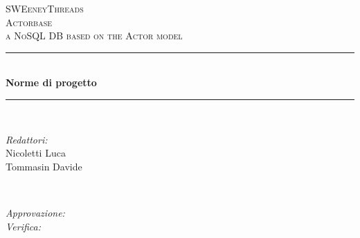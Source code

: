 \documentclass[a4paper]{article}
\begin{document}
	\begin{titlepage}
		\newcommand{\HRule}{\rule{\linewidth}{0.5mm}}
		\center

		\textsc{\LARGE SWEeneyThreads}\\[1.5cm]
		\textsc{\Large Actorbase}\\[0.5cm]
		\textsc{\large a NoSQL DB based on the Actor model}\\[0.5cm]


		\HRule \\[0.4cm]
		{ \huge \bfseries Norme di progetto}\\[0.4cm]
		\HRule \\[1.5cm]

		\begin{minipage}{0.4\textwidth}
			\begin{flushleft} \large
				\emph{Redattori:}\\
				Nicoletti Luca \\
				Tommasin Davide\\
			\end{flushleft}
		\end{minipage}
		~
		\begin{minipage}{0.4\textwidth}
			\begin{flushright} \large
				\emph{Approvazione:} \\
				\emph{Verifica:} \\
			\end{flushright}
		\end{minipage}


\end{titlepage}
\end{document}
